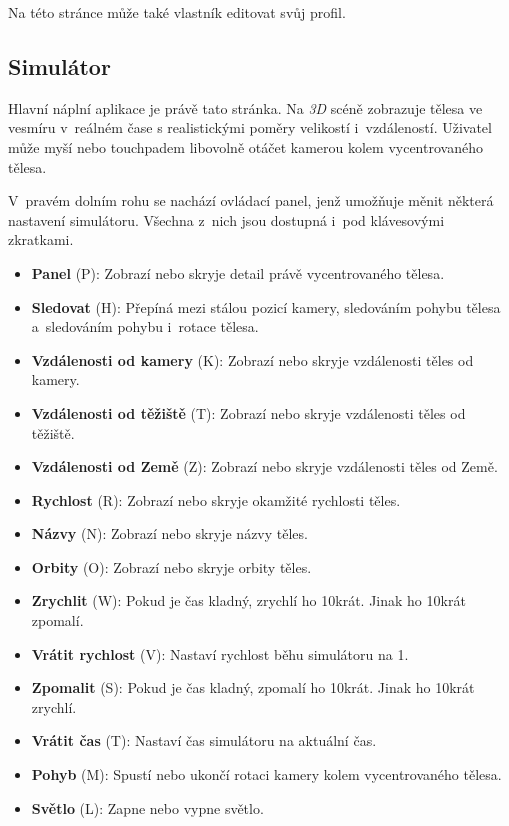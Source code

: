 \documentclass[a4paper,12pt]{article}
\begin{document}
Na této stránce může také vlastník editovat svůj profil.

\subsection{Simulátor}

Hlavní náplní aplikace je právě tato stránka. Na \textit{3D} scéně zobrazuje tělesa ve vesmíru v~reálném čase s realistickými poměry velikostí i~vzdáleností. Uživatel může myší nebo touchpadem libovolně otáčet kamerou kolem vycentrovaného tělesa.

V~pravém dolním rohu se nachází ovládací panel, jenž umožňuje měnit některá nastavení simulátoru. Všechna z~nich jsou dostupná i~pod klávesovými zkratkami.

\begin{itemize}
\item \textbf{Panel} (P): Zobrazí nebo skryje detail právě vycentrovaného tělesa.
\item \textbf{Sledovat} (H): Přepíná mezi stálou pozicí kamery, sledováním pohybu tělesa a~sledováním pohybu i~rotace tělesa.
\item \textbf{Vzdálenosti od kamery} (K): Zobrazí nebo skryje vzdálenosti těles od kamery.
\item \textbf{Vzdálenosti od těžiště} (T): Zobrazí nebo skryje vzdálenosti těles od těžiště.
\item \textbf{Vzdálenosti od Země} (Z): Zobrazí nebo skryje vzdálenosti těles od Země.
\item \textbf{Rychlost} (R): Zobrazí nebo skryje okamžité rychlosti těles.
\item \textbf{Názvy} (N): Zobrazí nebo skryje názvy těles.
\item \textbf{Orbity} (O): Zobrazí nebo skryje orbity těles.
\item \textbf{Zrychlit} (W): Pokud je čas kladný, zrychlí ho 10krát. Jinak ho 10krát zpomalí.
\item \textbf{Vrátit rychlost} (V): Nastaví rychlost běhu simulátoru na 1.
\item \textbf{Zpomalit} (S): Pokud je čas kladný, zpomalí ho 10krát. Jinak ho 10krát zrychlí.
\item \textbf{Vrátit čas} (T): Nastaví čas simulátoru na aktuální čas.
\item \textbf{Pohyb} (M): Spustí nebo ukončí rotaci kamery kolem vycentrovaného tělesa.
\item \textbf{Světlo} (L): Zapne nebo vypne světlo.
\end{itemize}
\end{document}
